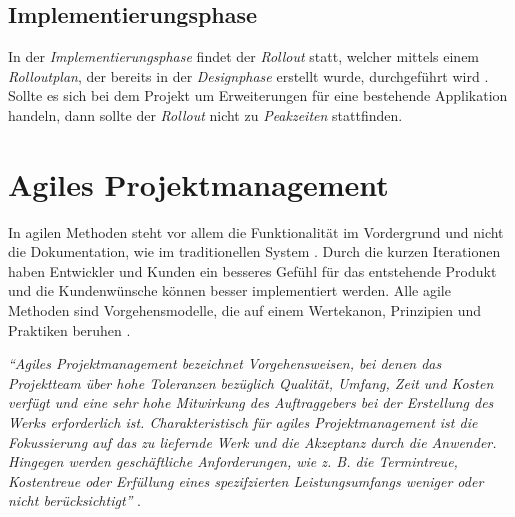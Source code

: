 \subsection{Implementierungsphase}
In der \textit{Implementierungsphase} findet der \textit{Rollout} statt, welcher mittels einem \textit{Rolloutplan}, der bereits in der \textit{Designphase} erstellt wurde, durchgeführt wird \cite{pm-wasserfall-online}. Sollte es sich bei dem Projekt um Erweiterungen für eine bestehende Applikation handeln, dann sollte der \textit{Rollout} nicht zu \textit{Peakzeiten} stattfinden.
\section{Agiles Projektmanagement}
\label{chapter:agil-pm}
In agilen Methoden steht vor allem die Funktionalität im Vordergrund und nicht die Dokumentation, wie im traditionellen System \cite{pm-agil-ursula}. Durch die kurzen Iterationen haben Entwickler und Kunden ein besseres Gefühl für das entstehende Produkt und die Kundenwünsche können besser implementiert werden. Alle agile Methoden sind Vorgehensmodelle, die auf einem Wertekanon, Prinzipien und Praktiken beruhen \cite{pm-agil-ursula}. 
\begin{center}
	\textit{\enquote{Agiles Projektmanagement bezeichnet Vorgehensweisen, 
			bei denen das Projektteam über hohe Toleranzen bezüglich Qualität, Umfang, Zeit und Kosten verfügt und eine sehr hohe Mitwirkung des Auftraggebers bei der Erstellung des Werks erforderlich ist. Charakteristisch für agiles Projektmanagement ist die Fokussierung auf das zu liefernde Werk und die Akzeptanz durch die Anwender. Hingegen werden geschäftliche Anforderungen, wie z. B. die Termintreue, Kostentreue oder Erfüllung eines spezifzierten Leistungsumfangs weniger oder nicht berücksichtigt}}  \cite{pm-agil-magazin}.
\end{center}
